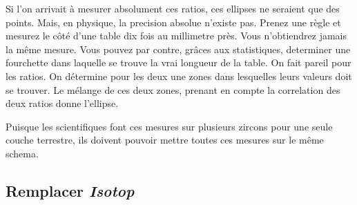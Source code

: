Si l'on arrivait à mesurer absolument ces ratios, ces ellipses ne seraient que des points. Mais, en physique, la precision absolue n'existe pas. Prenez une règle et mesurez le côté d'une table dix fois au millimetre près. Vous n'obtiendrez jamais la même mesure. Vous pouvez par contre, grâces aux statistiques, determiner une fourchette dans laquelle se trouve la vrai longueur de la table. On fait pareil pour les ratios. On détermine pour les deux une zones dans lesquelles leurs valeurs doit se trouver. Le mélange de ces deux zones, prenant en compte la correlation des deux ratios donne l'ellipse.

Puisque les scientifiques font ces mesures sur plusieurs zircons pour une seule couche terrestre, ils doivent pouvoir mettre toutes ces mesures sur le même schema.




\subsection{Remplacer \textit{Isotop}}
